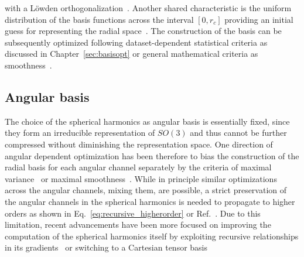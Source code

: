 with a Löwden orthogonalization~\cite{PIELA2014e99}.
Another shared characteristic is the uniform distribution of the basis functions across the interval $[0, r_c]$ providing an initial guess for representing the radial space~\cite{schutt2018schnet,musil2021efficient,dusson2022atomic}.
The construction of the basis can be subsequently optimized following dataset-dependent statistical criteria as discussed in Chapter~\ref{sec:basisopt} or general mathematical criteria as smoothness~\cite{bigi2022smooth}.
\subsection{Angular basis}
The choice of the spherical harmonics as angular basis is essentially fixed, since they form an irreducible representation of $SO(3)$ and thus cannot be further compressed without diminishing the representation space. %
%
%
One direction of angular dependent optimization has been therefore to bias the construction of the radial basis for each angular channel separately by the criteria of maximal variance~\cite{goscinski2021optimal} or maximal smoothness~\cite{bigi2022smooth}.
While in principle similar optimizations across the angular channels, mixing them, are possible, a strict preservation of the angular channels in the spherical harmonics is needed to propagate to higher orders as shown in Eq.~\eqref{eq:recursive_higherorder} or Ref.~\cite{kondor_clebsch_2018}.
Due to this limitation, recent advancements have been more focused on improving the computation of the spherical harmonics itself by exploiting recursive relationships in its gradients~\cite{bigi2023sphericart} or switching to a Cartesian tensor basis~\cite{shapeev2016moment,schutt2021equivariant,simeon2023tensornet}
